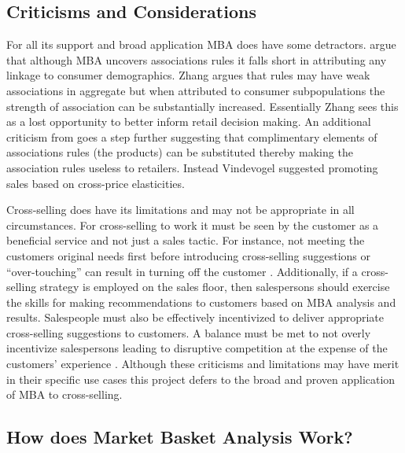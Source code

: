 \documentclass[../article.tex, 12pt]{subfiles}
\begin{document}
\begin{multicols*}{2}
\subsection{Criticisms and Considerations}

For all its support and broad application MBA does have some detractors. \cite{zhang2021measuring} argue that although MBA uncovers associations rules it falls short in attributing any linkage to consumer demographics. Zhang argues that rules may have weak associations in aggregate but when attributed to consumer subpopulations the strength of association can be substantially increased. Essentially Zhang sees this as a lost opportunity to better inform retail decision making. An additional criticism from \cite{vindevogel2005promotion} goes a step further suggesting that complimentary elements of associations rules (the products) can be substituted thereby making the association rules useless to retailers. Instead Vindevogel suggested promoting sales based on cross-price elasticities.

\par
Cross-selling does have its limitations and may not be appropriate in all circumstances. For cross-selling to work it must be seen by the customer as a beneficial service and not just a sales tactic. For instance, not meeting the customers original needs first before introducing cross-selling suggestions or ``over-touching'' can result in turning off the customer \citep{kamakura2008cross}. Additionally, if a cross-selling strategy is employed on the sales floor, then salespersons should exercise the skills for making recommendations to customers based on MBA analysis and results. Salespeople must also be effectively incentivized to deliver appropriate cross-selling suggestions to customers. A balance must be met to not overly incentivize salespersons leading to disruptive competition at the expense of the customers' experience \citep{kamakura2007chain}. Although these criticisms and limitations may have merit in their specific use cases this project defers to the broad and proven application of MBA to cross-selling.

\subsection{How does Market Basket Analysis Work?}


\end{multicols*}
\end{document}
